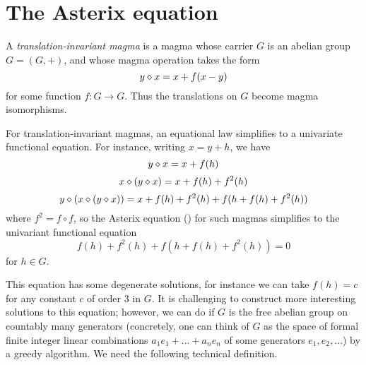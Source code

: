 \chapter{The Asterix equation}\label{asterix-chapter}

A \emph{translation-invariant magma} is a magma whose carrier $G$ is an abelian group $G = (G,+)$, and whose magma operation takes the form
$$ y \diamond x = x + f(x-y)$$
for some function $f: G \to G$.  Thus the translations on $G$ become magma isomorphisms.

For translation-invariant magmas, an equational law simplifies to a univariate functional equation.  For instance, writing $x = y+h$, we have
$$ y \diamond x = x + f(h)$$
$$ x \diamond (y \diamond x) = x + f(h) + f^2(h)$$
$$ y \diamond (x \diamond (y \diamond x)) = x + f(h) + f^2(h) + f( h + f(h) + f^2(h) )$$
where $f^2 = f \circ f$, so the Asterix equation () for such magmas simplifies to the univariant functional equation
\begin{equation}\label{fh}
   f(h) + f^2(h) + f( h + f(h) + f^2(h) ) = 0
\end{equation}
for $h \in G$.

This equation has some degenerate solutions, for instance we can take $f(h) = c$ for any constant $c$ of order $3$ in $G$.  It is challenging to construct more interesting solutions to this equation; however, we can do if $G$ is the free abelian group on countably many generators (concretely, one can think of $G$ as the space of formal finite integer linear combinations $a_1 e_1 + \dots + a_n e_n$ of some generators $e_1, e_2, \dots$) by a greedy algorithm.  We need the following technical definition.

